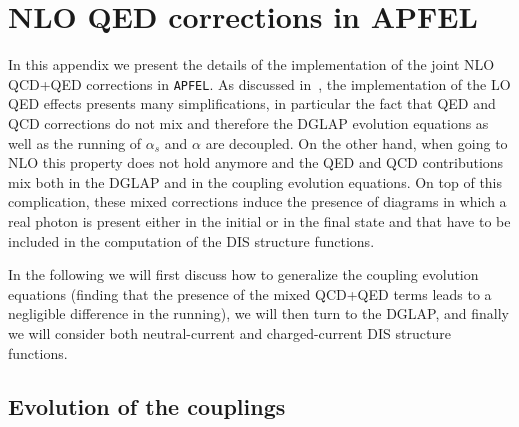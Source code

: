\appendix

\section{NLO QED corrections in APFEL} \label{sec:appendixAPFEL}

In this appendix we present the details of the implementation of the
joint NLO QCD+QED corrections in {\tt APFEL}.
%
As discussed in~\cite{Bertone:2013vaa}, the implementation of the LO
QED effects presents many simplifications, in particular the fact that
QED and QCD corrections do not mix and therefore the DGLAP evolution
equations as well as the running of $\alpha_s$ and $\alpha$ are
decoupled.
%
On the other hand, when going to NLO this property does not hold
anymore and the QED and QCD contributions mix both in the DGLAP and in
the coupling evolution equations.
%
On top of this complication, these mixed corrections induce the
presence of diagrams in which a real photon is present either in the
initial or in the final state and that have to be included in the
computation of the DIS structure functions.

In the following we will first discuss how to generalize the coupling
evolution equations (finding that the presence of the mixed QCD+QED
terms leads to a negligible difference in the running), we will then
turn to the DGLAP, and finally we will consider both neutral-current
and charged-current DIS structure functions.

\subsection{Evolution of the couplings}

